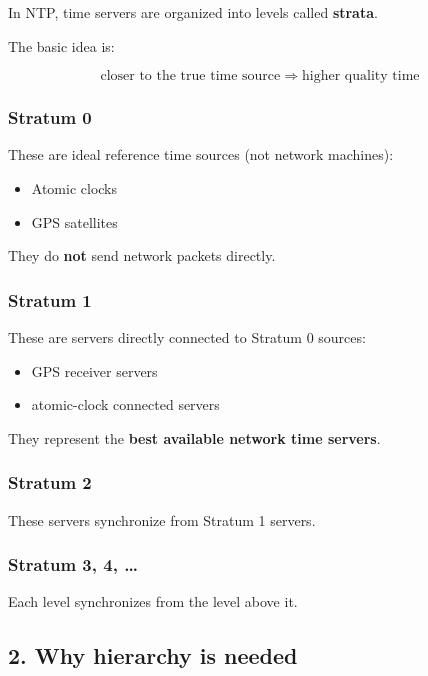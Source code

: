 In NTP, time servers are organized into levels called \textbf{strata}.

The basic idea is:

\[
\text{closer to the true time source} \;\Rightarrow\; \text{higher quality time}
\]



\subsubsection{Stratum 0}

These are ideal reference time sources (not network machines):

\begin{itemize}
    \item Atomic clocks
    \item GPS satellites
\end{itemize}

They do \textbf{not} send network packets directly.



\subsubsection{Stratum 1}

These are servers directly connected to Stratum 0 sources:

\begin{itemize}
    \item GPS receiver servers
    \item atomic-clock connected servers
\end{itemize}

They represent the \textbf{best available network time servers}.



\subsubsection{Stratum 2}

These servers synchronize from Stratum 1 servers.



\subsubsection{Stratum 3, 4, \dots}

Each level synchronizes from the level above it.



\subsection{2. Why hierarchy is needed}

